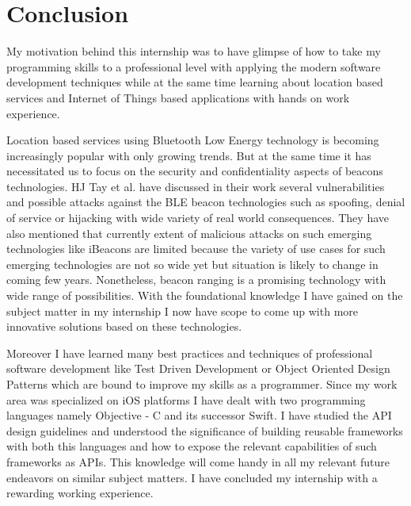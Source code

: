 \section{Conclusion}
My motivation behind this internship was to have glimpse of how to take my programming skills to a professional level with applying the modern software development techniques while at the same time learning about location based services and Internet of Things based applications with hands on work experience. 
\par Location based services using Bluetooth Low Energy technology is becoming increasingly popular with only growing trends. But at the same time it has necessitated us to focus on the security and confidentiality aspects of  beacons technologies. HJ Tay et al. \cite{tay2016survey} have discussed in their work several vulnerabilities and possible attacks against the BLE beacon technologies such as spoofing, denial of service or hijacking with wide variety of real world consequences. They have also mentioned that currently extent of malicious attacks on such emerging technologies like iBeacons are limited because the variety of use cases for such emerging technologies are not so wide yet but situation is likely to change in coming few years. Nonetheless, beacon ranging is a promising technology with wide range of possibilities. With the foundational knowledge I have gained on the subject matter in my internship I now have scope to come up with more innovative solutions based on these technologies.
\par Moreover I have learned many best practices and techniques of professional software development like Test Driven Development or Object Oriented Design Patterns which are bound to improve my skills as a programmer. Since my work area was specialized on iOS platforms I have dealt with two programming languages namely Objective - C and its successor Swift. I have studied the API design guidelines and understood the significance of building reusable frameworks with both this languages and how to expose the relevant capabilities of such frameworks as APIs. This knowledge will come handy in all my relevant future endeavors on similar subject matters. I have concluded my internship with a rewarding working experience. 